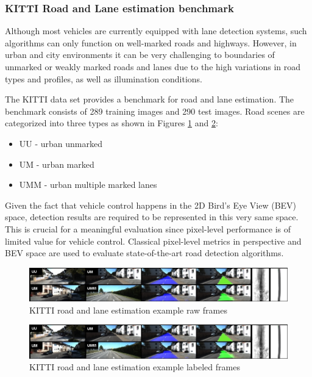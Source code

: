 \subsubsection{KITTI Road and Lane estimation benchmark}
Although most vehicles are currently equipped with lane detection systems, such algorithms can only function on well-marked roads and highways. However, in urban and city environments it can be very challenging to boundaries of unmarked or weakly marked roads and lanes due to the high variations in road types and profiles, as well as illumination conditions.

The KITTI data set provides a benchmark for road and lane estimation. The benchmark consists of 289 training images and 290 test images. Road scenes are categorized into three types as shown in Figures \ref{kitti_raw_road} and \ref{kitti_labeled_road}:
\begin{itemize}
\item UU - urban unmarked
\item UM - urban marked
\item UMM - urban multiple marked lanes
\end{itemize}


Given the fact that vehicle control happens in the 2D Bird’s Eye View (BEV) space, detection results are required to be represented in this very same space. This is crucial for a meaningful evaluation since pixel-level performance is of limited value for vehicle control. Classical pixel-level metrics in perspective and BEV space are used to evaluate state-of-the-art road detection algorithms.

\begin{figure}[ht]
\includegraphics[trim={0cm 0 19cm 0cm},clip,width=\linewidth]{Figures/KITTI_road.jpg}
\centering
\caption{KITTI road and lane estimation example raw frames \cite{kitti_road}}
\label{kitti_raw_road}
\end{figure}

\begin{figure}[ht]
\includegraphics[trim={15cm 0cm 0cm 0cm},clip,width=\linewidth]{Figures/KITTI_road.jpg}
\centering
\caption{KITTI road and lane estimation example labeled frames \cite{kitti_road}}
\label{kitti_labeled_road}
\end{figure}

